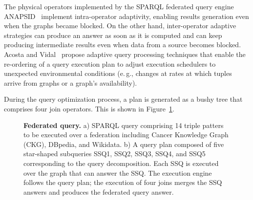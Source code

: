 \documentclass[a4paper,USenglish]{tgdk-v2021}
\begin{document}
\begin{itemize}
    The physical operators implemented by the SPARQL federated query engine ANAPSID~\cite{DBLP:conf/semweb/AcostaVLCR11} implement intra-operator adaptivity, enabling results generation even when the graphs became blocked.
    On the other hand, inter-operator adaptive strategies can produce an answer as soon as it is computed and can keep producing intermediate results even when data from a source becomes blocked. 
    Acosta and Vidal~\cite{DBLP:conf/semweb/AcostaV15} propose adaptive query processing techniques that enable the re-ordering of a query execution plan to adjust execution schedulers to unexpected environmental conditions (e.\,g., changes at rates at which tuples arrive from graphs or a graph's availability).
\end{itemize}

During the query optimization process, a plan is generated as a bushy tree that comprises four join operators.  
This is shown in Figure~\ref{fig:federatedQuery}.

\begin{figure}[!ht]
\centering
{}
\caption{\textbf{Federated query.} a) SPARQL query comprising 14 triple patters to be executed over a federation including Cancer Knowledge Graph (CKG), DBpedia, and Wikidata. b) A query plan composed of five star-shaped subqueries SSQ1, SSQ2, SSQ3, SSQ4, and SSQ5 corresponding to the query decomposition. 
Each SSQ is executed over the graph that can answer the SSQ. The execution engine follows the query plan; the execution of four joins merges the SSQ answers and produces the federated query answer.}
\label{fig:federatedQuery}
\end{figure}
\end{document}
